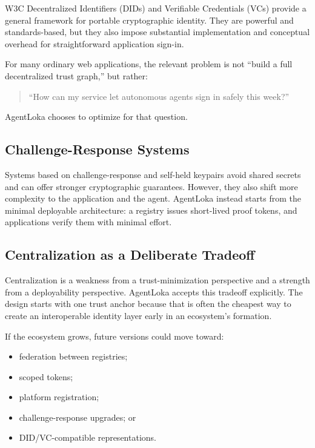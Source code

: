 \documentclass[11pt]{article}
\begin{document}
W3C Decentralized Identifiers (DIDs) and Verifiable Credentials (VCs) provide a general framework for portable cryptographic identity. They are powerful and standards-based, but they also impose substantial implementation and conceptual overhead for straightforward application sign-in.

For many ordinary web applications, the relevant problem is not ``build a full decentralized trust graph,'' but rather:

\begin{quote}
``How can my service let autonomous agents sign in safely this week?''
\end{quote}

AgentLoka chooses to optimize for that question.

\subsection{Challenge-Response Systems}

Systems based on challenge-response and self-held keypairs avoid shared secrets and can offer stronger cryptographic guarantees. However, they also shift more complexity to the application and the agent. AgentLoka instead starts from the minimal deployable architecture: a registry issues short-lived proof tokens, and applications verify them with minimal effort.

\subsection{Centralization as a Deliberate Tradeoff}

Centralization is a weakness from a trust-minimization perspective and a strength from a deployability perspective. AgentLoka accepts this tradeoff explicitly. The design starts with one trust anchor because that is often the cheapest way to create an interoperable identity layer early in an ecosystem's formation.

If the ecosystem grows, future versions could move toward:

\begin{itemize}
  \item federation between registries;
  \item scoped tokens;
  \item platform registration;
  \item challenge-response upgrades; or
  \item DID/VC-compatible representations.
\end{itemize}
\end{document}

